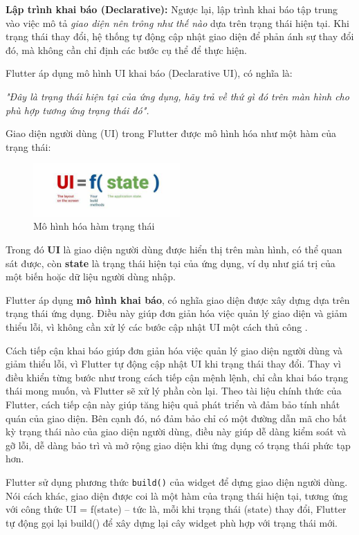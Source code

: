 \documentclass[../DoAn.tex]{subfiles}
\numberwithin{figure}{chapter}
\begin{document}
\textbf{Lập trình khai báo (Declarative):} Ngược lại, lập trình khai báo tập trung vào việc mô tả \textit{giao diện nên trông như thế nào} dựa trên trạng thái hiện tại. Khi trạng thái thay đổi, hệ thống tự động cập nhật giao diện để phản ánh sự thay đổi đó, mà không cần chỉ định các bước cụ thể để thực hiện.

Flutter áp dụng mô hình UI khai báo (Declarative UI), có nghĩa là:

\textit{
"Đây là trạng thái hiện tại của ứng dụng, hãy trả về thứ gì đó trên màn hình cho phù hợp tương ứng trạng thái đó".
}

Giao diện người dùng (UI) trong Flutter được mô hình hóa như một hàm của trạng thái:
\begin{figure}[H]
    \centering
    \includegraphics[width=0.5\textwidth]{Hinhve/Chuong5/flutterState.jpg}
    \caption{Mô hình hóa hàm trạng thái}
    \label{fig:flutterstate}
\end{figure}
Trong đó \textbf{UI} là giao diện người dùng được hiển thị trên màn hình, có thể quan sát được, còn \textbf{state} là trạng thái hiện tại của ứng dụng, ví dụ như giá trị của một biến hoặc dữ liệu người dùng nhập.

Flutter áp dụng \textbf{mô hình khai báo}, có nghĩa giao diện được xây dựng dựa trên trạng thái ứng dụng. Điều này giúp đơn giản hóa việc quản lý giao diện và giảm thiểu lỗi, vì không cần xử lý các bước cập nhật UI một cách thủ công .

Cách tiếp cận khai báo giúp đơn giản hóa việc quản lý giao diện người dùng và giảm thiểu lỗi, vì Flutter tự động cập nhật UI khi trạng thái thay đổi. Thay vì điều khiển từng bước như trong cách tiếp cận mệnh lệnh, chỉ cần khai báo trạng thái mong muốn, và Flutter sẽ xử lý phần còn lại. Theo tài liệu chính thức của Flutter, cách tiếp cận này giúp tăng hiệu quả phát triển và đảm bảo tính nhất quán của giao diện. Bên cạnh đó, nó đảm bảo chỉ có một đường dẫn mã cho bất kỳ trạng thái nào của giao diện người dùng, điều này giúp dễ dàng kiểm soát và gỡ lỗi, dễ dàng bảo trì và mở rộng giao diện khi ứng dụng có trạng thái phức tạp hơn.

Flutter sử dụng phương thức \texttt{build()} của widget để dựng giao diện người dùng. Nói cách khác, giao diện được coi là một hàm của trạng thái hiện tại, tương ứng với công thức UI = f(state) – tức là, mỗi khi trạng thái (state) thay đổi, Flutter tự động gọi lại build() để xây dựng lại cây widget phù hợp với trạng thái mới. 
\end{document}
